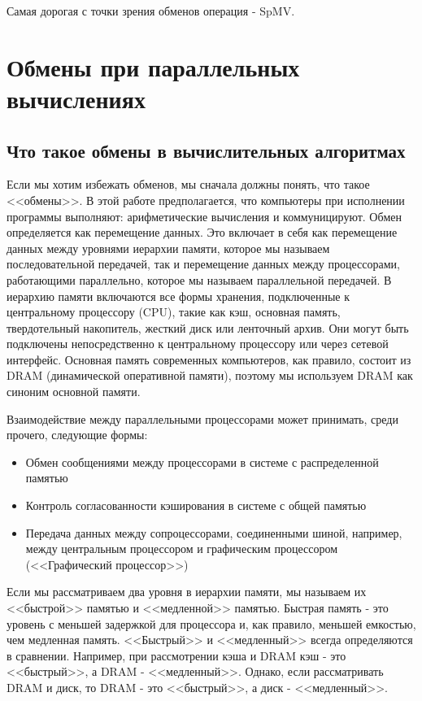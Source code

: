 \documentclass[a4paper,12pt]{report}
\begin{document}
    Самая дорогая с точки зрения обменов операция - SpMV. 
    
    \chapter{ Обмены при параллельных вычислениях}

    \section{Что такое обмены в вычислительных алгоритмах}
    Если мы хотим избежать обменов, мы сначала должны понять, что такое <<обмены>>. В этой работе предполагается, что компьютеры при исполнении программы выполняют: арифметические вычисления и коммуницируют. Обмен определяется как перемещение данных. Это включает в себя как перемещение данных между уровнями иерархии памяти, которое мы называем последовательной передачей, так и перемещение данных между процессорами, работающими параллельно, которое мы называем параллельной передачей. В иерархию памяти включаются все формы хранения, подключенные к центральному процессору (CPU), такие как кэш, основная память, твердотельный накопитель, жесткий диск или ленточный архив. Они могут быть подключены непосредственно к центральному процессору или через сетевой интерфейс. Основная память современных компьютеров, как правило, состоит из DRAM (динамической оперативной памяти), поэтому мы используем DRAM как синоним основной памяти.      

    Взаимодействие между параллельными процессорами может принимать, среди прочего, следующие формы: 
    \begin{itemize}
        \item Обмен сообщениями между процессорами в системе с распределенной памятью
        \item Контроль согласованности кэширования в системе с общей памятью
        \item Передача данных между сопроцессорами, соединенными шиной, например, между центральным процессором и графическим процессором (<<Графический процессор>>)
    \end{itemize}

    Если мы рассматриваем два уровня в иерархии памяти, мы называем их <<быстрой>> памятью и <<медленной>> памятью. Быстрая память - это уровень с меньшей задержкой для процессора и, как правило, меньшей емкостью, чем медленная память. <<Быстрый>> и <<медленный>> всегда определяются в сравнении. Например, при рассмотрении кэша и DRAM кэш - это <<быстрый>>, а DRAM - <<медленный>>. Однако, если рассматривать DRAM и диск, то DRAM - это <<быстрый>>, а диск - <<медленный>>.
    
\end{document}
